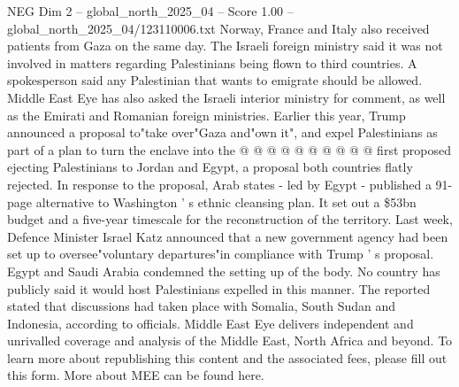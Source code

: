 \begin{textsample}{NEG Dim 2 – global\_north\_2025\_04 – Score 1.00 – global\_north\_2025\_04/123110006.txt}
Norway, France and Italy also received patients from Gaza on the same day.
The Israeli foreign ministry said it was not involved in matters regarding Palestinians being flown to third countries.
A spokesperson said any Palestinian that wants to emigrate should be allowed.
Middle East Eye has also asked the Israeli interior ministry for comment, as well as the Emirati and Romanian foreign ministries.
Earlier this year, Trump announced a proposal to"take over"Gaza and"own it", and expel Palestinians as part of a plan to turn the enclave into the @ @ @ @ @ @ @ @ @ @ first proposed ejecting Palestinians to Jordan and Egypt, a proposal both countries flatly rejected.
In response to the proposal, Arab states - led by Egypt - published a 91-page alternative to Washington ' s ethnic cleansing plan.
It set out a \$53bn budget and a five-year timescale for the reconstruction of the territory.
Last week, Defence Minister Israel Katz announced that a new government agency had been set up to oversee"voluntary departures"in compliance with Trump ' s proposal.
Egypt and Saudi Arabia condemned the setting up of the body.
No country has publicly said it would host Palestinians expelled in this manner.
The reported stated that discussions had taken place with Somalia, South Sudan and Indonesia, according to officials.
Middle East Eye delivers independent and unrivalled coverage and analysis of the Middle East, North Africa and beyond.
To learn more about republishing this content and the associated fees, please fill out this form.
More about MEE can be found here.

\end{textsample}
